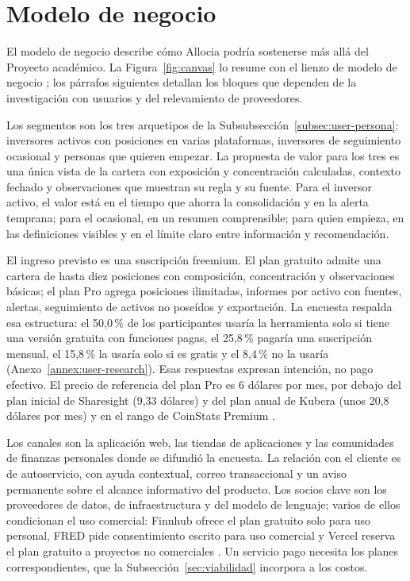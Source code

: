\section{Modelo de negocio}\label{sec:modelo-negocio}

El modelo de negocio describe cómo Allocia podría sostenerse más allá del Proyecto académico. La Figura~\ref{fig:canvas} lo resume con el lienzo de modelo de negocio \parencite{Osterwalder2010}; los párrafos siguientes detallan los bloques que dependen de la investigación con usuarios y del relevamiento de proveedores.


Los segmentos son los tres arquetipos de la Subsubsección~\ref{subsec:user-persona}: inversores activos con posiciones en varias plataformas, inversores de seguimiento ocasional y personas que quieren empezar. La propuesta de valor para los tres es una única vista de la cartera con exposición y concentración calculadas, contexto fechado y observaciones que muestran su regla y su fuente. Para el inversor activo, el valor está en el tiempo que ahorra la consolidación y en la alerta temprana; para el ocasional, en un resumen comprensible; para quien empieza, en las definiciones visibles y en el límite claro entre información y recomendación.

El ingreso previsto es una suscripción freemium. El plan gratuito admite una cartera de hasta diez posiciones con composición, concentración y observaciones básicas; el plan Pro agrega posiciones ilimitadas, informes por activo con fuentes, alertas, seguimiento de activos no poseídos y exportación. La encuesta respalda esa estructura: el 50,0\,\% de los participantes usaría la herramienta solo si tiene una versión gratuita con funciones pagas, el 25,8\,\% pagaría una suscripción mensual, el 15,8\,\% la usaría solo si es gratis y el 8,4\,\% no la usaría (Anexo~\ref{annex:user-research}). Esas respuestas expresan intención, no pago efectivo. El precio de referencia del plan Pro es 6 dólares por mes, por debajo del plan inicial de Sharesight (9,33 dólares) y del plan anual de Kubera (unos 20,8 dólares por mes) y en el rango de CoinStats Premium \parencite{SharesightPricing,KuberaPricing,CoinStatsPricing}.

Los canales son la aplicación web, las tiendas de aplicaciones y las comunidades de finanzas personales donde se difundió la encuesta. La relación con el cliente es de autoservicio, con ayuda contextual, correo transaccional y un aviso permanente sobre el alcance informativo del producto. Los socios clave son los proveedores de datos, de infraestructura y del modelo de lenguaje; varios de ellos condicionan el uso comercial: Finnhub ofrece el plan gratuito solo para uso personal, FRED pide consentimiento escrito para uso comercial y Vercel reserva el plan gratuito a proyectos no comerciales \parencite{FinnhubPricing,FredTerms,VercelPricing}. Un servicio pago necesita los planes correspondientes, que la Subsección~\ref{sec:viabilidad} incorpora a los costos.

